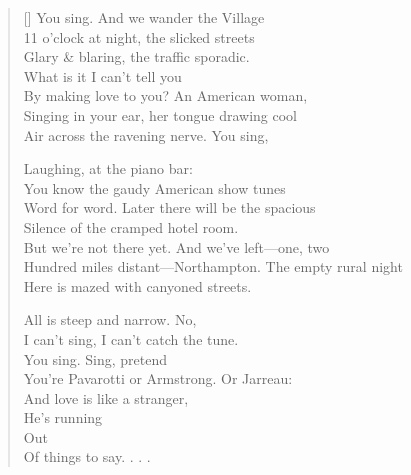 \label{ch:lovers}
\settowidth{\versewidth}{Hundred miles distant—Northampton.  The empty rural night}
\begin{verse}[\versewidth]
You sing. And we wander the Village\\
11 o'clock at night, the slicked streets\\
Glary \& blaring, the traffic sporadic.\\
What is it I can't tell you\\
By making love to you? An American woman,\\
Singing in your ear, her tongue drawing cool\\
Air across the ravening nerve.   You sing,

Laughing, at the piano bar:\\
You know the gaudy American show tunes\\
Word for word. Later there will be the spacious\\
Silence of the cramped hotel room.\\
But we're not there yet.   And we've left---one, two\\
Hundred miles distant---Northampton.  The empty rural night\\
Here is mazed with canyoned streets.

All is steep and narrow.   No,\\
I can't sing, I can't catch the tune.\\
You sing.  Sing, pretend\\
You're Pavarotti or Armstrong.   Or Jarreau:\\
And love is like a stranger,\\
He's running\\
Out\\
Of things to say. . . .
\end{verse}

